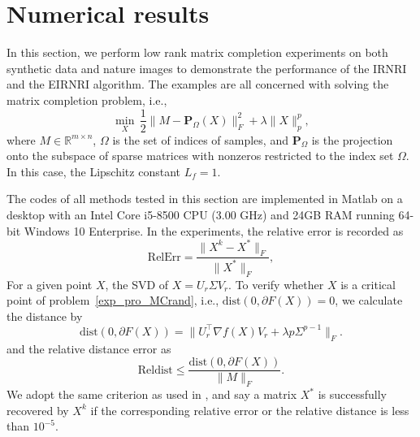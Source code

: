 \documentclass[twoside,11pt]{article}
\numberwithin{equation}{section}
\begin{document}

\section{Numerical results} 
In this section, we perform low rank matrix completion experiments on both synthetic data and nature images to demonstrate the performance of the IRNRI and the EIRNRI algorithm. 
The examples are all concerned with solving the matrix completion problem, {i.e.},
\begin{equation}\label{exp_pro_MCrand}
    \min\limits_{X}\, \frac{1}{2}\|M-\mathbf{P}_{\Omega} (X)\|_{F}^{2} + \lambda\|X\|_{p}^{p},
\end{equation}
where $M\in\mathbb{R}^{m\times n} $, $\Omega $ is the set of indices of samples, and $\mathbf{P}_{\Omega}$ is the projection onto the subspace of sparse matrices with nonzeros restricted to the index set $\Omega$. 
In this case, the Lipschitz constant $L_{f} = 1$. %

The codes of all methods tested in this section are implemented in Matlab on a desktop with an Intel Core i5-8500 CPU  (3.00 GHz) and 24GB RAM running 64-bit Windows 10 Enterprise. 
In the experiments, the relative error is recorded as
\begin{equation}
    \text{RelErr} = \frac{\|X^{k}-X^{*}\|_{F} }{\|X^{*}\|_{F}},
\end{equation}
For a given point $X$, the SVD of $X=U_{r}\Sigma V_{r}$.  
 To verify whether $X$ is a critical point of problem~\eqref{exp_pro_MCrand}, {i.e.}, $\text{dist} (0,\partial F (X)) = 0$,  
 we calculate \cite{opt_simu_svd_2017} the distance  by 
\begin{equation}
    \text{dist} (0,\partial F (X)) = \|U_{r}^{\top}\nabla f (X)V_{r}+\lambda p \Sigma^{p-1} \|_{F}.
\end{equation}
and the relative distance error as
\begin{equation}
    \text{Reldist} \le \frac{\text{dist} (0,\partial F (X))}{\|M\|_{F}}.
\end{equation}
We adopt the same criterion as used in  \cite{ExpCriterion_2010,opt_simu_svd_2017}, and say a matrix $X^{*} $ is successfully recovered by $X^{k}$ if the corresponding relative error or the relative distance is less than $10^{-5}$.
\end{document}
